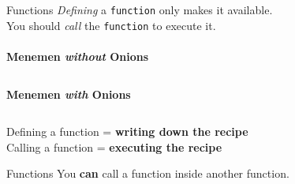         \begin{frame}{Functions}
            \LARGE
            \textit{Defining} a \texttt{function} only makes it available.\\
            \pause
            You should \textit{call} the \texttt{function} to execute it.\\
            \pause
            \\
            \large
            \textbf{Menemen \textit{without} Onions}
            \inputminted[firstline=32, lastline=33, frame=single,framesep=2pt]{python3}{code-examples/menemen.py}
            \pause
            \textbf{Menemen \textit{with} Onions}
            \inputminted[firstline=35, lastline=38, frame=single,framesep=2pt]{python3}{code-examples/menemen.py}
            \begin{center}
            Defining a function = \textbf{writing down the recipe}\\
            Calling a function = \textbf{executing the recipe}
            \end{center}
        \end{frame}

        \begin{frame}{Functions}
            \LARGE
            You \textbf{can} call a function inside another function.\\
            \pause
            \large
            \inputminted[firstline=22, lastline=24, frame=single,framesep=2pt]{python3}{code-examples/menemen.py}
            \pause
            \inputminted[firstline=26, lastline=30, frame=single,framesep=2pt]{python3}{code-examples/menemen.py}
        \end{frame}

